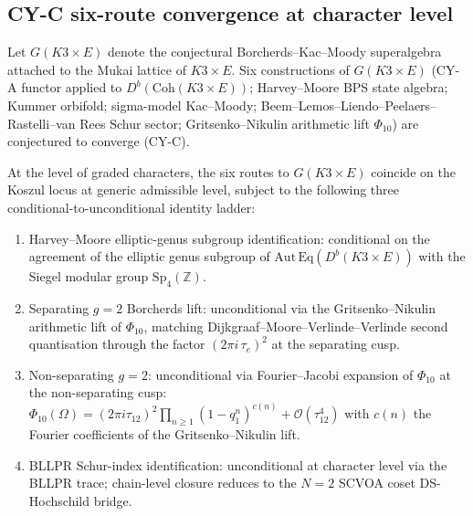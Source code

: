 \documentclass[11pt]{article}
\begin{document}
\subsection{CY-C six-route convergence at character level}
\label{subsec:cy-c-character-level}

Let $G(K3 \times E)$ denote the conjectural Borcherds--Kac--Moody
superalgebra attached to the Mukai lattice of $K3 \times E$. Six
constructions of $G(K3 \times E)$ (CY-A functor applied to
$D^b(\mathrm{Coh}(K3 \times E))$; Harvey--Moore BPS state algebra;
Kummer orbifold; sigma-model Kac--Moody; Beem--Lemos--Liendo--Peelaers--Rastelli--van Rees
Schur sector; Gritsenko--Nikulin arithmetic lift $\Phi_{10}$) are
conjectured to converge (CY-C).

\begin{theorem}
\label{thm:cy-c-character-level}
At the level of graded characters, the six routes to $G(K3 \times E)$
coincide on the Koszul locus at generic admissible level, subject to
the following three conditional-to-unconditional identity ladder:
\begin{enumerate}
\item[$I_1$] Harvey--Moore elliptic-genus subgroup identification:
conditional on the agreement of the elliptic genus subgroup of
$\mathrm{Aut}\,\mathrm{Eq}(D^b(K3 \times E))$ with the Siegel modular
group $\mathrm{Sp}_4(\mathbb{Z})$.
\item[$I_{2}^{\mathrm{sep}}$] Separating $g = 2$ Borcherds lift:
unconditional via the Gritsenko--Nikulin arithmetic lift of
$\Phi_{10}$, matching Dijkgraaf--Moore--Verlinde--Verlinde
second quantisation through the factor $(2\pi i\,\tau_e)^2$ at the
separating cusp.
\item[$I_{2}^{\mathrm{nonsep}}$] Non-separating $g = 2$: unconditional
via Fourier--Jacobi expansion of $\Phi_{10}$ at the non-separating
cusp:
$\Phi_{10}(\Omega) = (2\pi i \tau_{12})^2 \prod_{n \ge 1}
(1 - q_1^n)^{c(n)} + \mathcal{O}(\tau_{12}^4)$
with $c(n)$ the Fourier coefficients of the Gritsenko--Nikulin lift.
\item[$I_3$] BLLPR Schur-index identification: unconditional at
character level via the BLLPR trace; chain-level closure reduces to
the $N = 2$ SCVOA coset DS-Hochschild bridge.
\end{enumerate}
\end{theorem}
\end{document}
